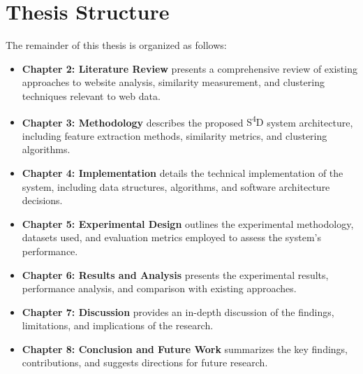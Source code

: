 \section{Thesis Structure}
\label{sec:thesis-structure}

The remainder of this thesis is organized as follows:

\begin{itemize}
    \item \textbf{Chapter 2: Literature Review} presents a comprehensive review of existing approaches to website analysis, similarity measurement, and clustering techniques relevant to web data.

    \item \textbf{Chapter 3: Methodology} describes the proposed \textlatin{S\textsuperscript{4}D} system architecture, including feature extraction methods, similarity metrics, and clustering algorithms.

    \item \textbf{Chapter 4: Implementation} details the technical implementation of the system, including data structures, algorithms, and software architecture decisions.

    \item \textbf{Chapter 5: Experimental Design} outlines the experimental methodology, datasets used, and evaluation metrics employed to assess the system's performance.

    \item \textbf{Chapter 6: Results and Analysis} presents the experimental results, performance analysis, and comparison with existing approaches.

    \item \textbf{Chapter 7: Discussion} provides an in-depth discussion of the findings, limitations, and implications of the research.

    \item \textbf{Chapter 8: Conclusion and Future Work} summarizes the key findings, contributions, and suggests directions for future research.
\end{itemize}
